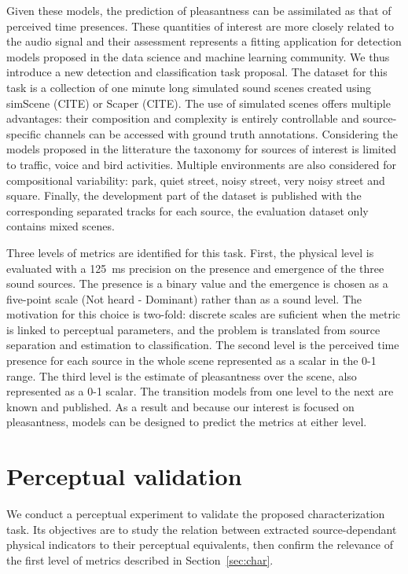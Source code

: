 \documentclass{article}
\begin{document}
\begin{sloppy}
Given these models, the prediction of pleasantness can be assimilated as that of perceived time presences. These quantities of interest are more closely related to the audio signal and their assessment represents a fitting application for detection models proposed in the data science and machine learning community. We thus introduce a new detection and classification task proposal. The dataset for this task is a collection of one minute long simulated sound scenes created using simScene (CITE) or Scaper (CITE). The use of simulated scenes offers multiple advantages: their composition and complexity is entirely controllable and source-specific channels can be accessed with ground truth annotations. Considering the models proposed in the litterature the taxonomy for sources of interest is limited to traffic, voice and bird activities. Multiple environments are also considered for compositional variability: park, quiet street, noisy street, very noisy street and square. Finally, the development part of the dataset is published with the corresponding separated tracks for each source, the evaluation dataset only contains mixed scenes.

Three levels of metrics are identified for this task. First, the physical level is evaluated with a 125~ms precision on the presence and emergence of the three sound sources. The presence is a binary value and the emergence is chosen as a five-point scale (Not heard - Dominant) rather than as a sound level. The motivation for this choice is two-fold: discrete scales are suficient when the metric is linked to perceptual parameters, and the problem is translated from source separation and estimation to classification. The second level is the perceived time presence for each source in the whole scene represented as a scalar in the 0-1 range. The third level is the estimate of pleasantness over the scene, also represented as a 0-1 scalar. The transition models from one level to the next are known and published. As a result and because our interest is focused on pleasantness, models can be designed to predict the metrics at either level.

\section{Perceptual validation}
\label{sec:val}

We conduct a perceptual experiment to validate the proposed characterization task. Its objectives are to study the relation between extracted source-dependant physical indicators to their perceptual equivalents, then confirm the relevance of the first level of metrics described in Section~\ref{sec:char}.


\end{sloppy}
\end{document}
